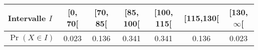 \documentclass{standalone}
\begin{document}
\begin{tabular}{l|c|c|c|c|c|c}
	Intervalle $I$ & [0, 70[ & [70, 85[ & [85, 100[ & [100, 115[ & [115,130[ & [130, $\infty$[\\
	\hline 
	$\Pr(X\in I)$ & 0.023    & 0.136    & 0.341     & 0.341      & 0.136       & 0.023
\end{tabular}
\end{document}
